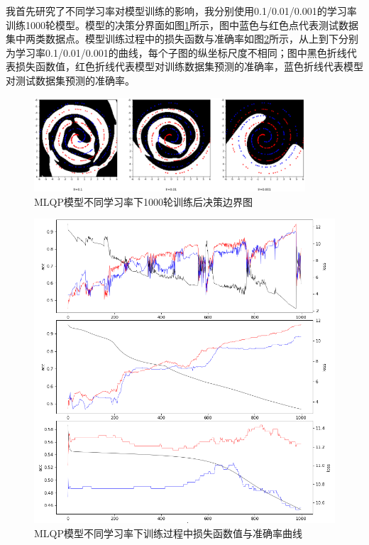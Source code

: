 \documentclass[12pt, a4paper, oneside]{ctexart}
\begin{document}
    我首先研究了不同学习率对模型训练的影响，我分别使用0.1/0.01/0.001的学习率训练1000轮模型。模型的决策分界面如图\ref{Fig-MLQP-lr-compare-boundary}所示，图中蓝色与红色点代表测试数据集中两类数据点。模型训练过程中的损失函数与准确率如图\ref{Fig-MLQP-lr-compare-logging}所示，从上到下分别为学习率0.1/0.01/0.001的曲线，每个子图的纵坐标尺度不相同；图中黑色折线代表损失函数值，红色折线代表模型对训练数据集预测的准确率，蓝色折线代表模型对测试数据集预测的准确率。
    \begin{figure}[htbp]
        \centering
        \includegraphics[width=0.9\textwidth]{figures/lr_compare_boundary.png}
        \caption{MLQP模型不同学习率下1000轮训练后决策边界图}
        \label{Fig-MLQP-lr-compare-boundary}
    \end{figure}
    
    \begin{figure}[htbp]
        \centering
        \includegraphics[width=1.0\textwidth]{figures/lr_compare_logging.png}
        \caption{MLQP模型不同学习率下训练过程中损失函数值与准确率曲线}
        \label{Fig-MLQP-lr-compare-logging}
    \end{figure}
\end{document}

